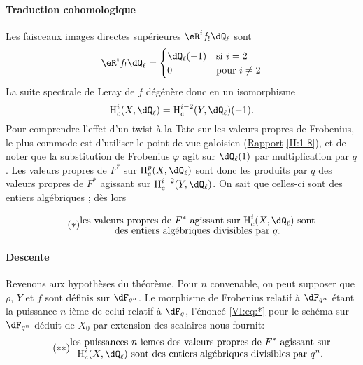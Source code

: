 \paragraph{Traduction cohomologique}
Les faisceaux images directes supérieures $\eR^i f_!\dQ_\ell$ sont 
\[
  \eR^i f_!\dQ_\ell = \begin{cases}
                       \dQ_\ell(-1) & \text{si $i = 2$} \\
                       0            & \text{pour $i\ne 2$}
                     \end{cases}
\]
La suite spectrale de Leray de $f$ dégénère donc en un isomorphisme 
\[
  \h_c^i(X,\dQ_\ell) = \h_c^{i-2}(Y,\dQ_\ell)(-1) \text{.}
\]
Pour comprendre l'effet d'un twist à la Tate sur les valeurs propres de 
Frobenius, le plus commode est d'utiliser le point de vue galoisien 
(\hyperref[II]{Rapport} \ref{II:1-8}), et de noter que la substitution de 
Frobenius $\varphi$ agit sur $\dQ_\ell(1)$ par multiplication par $q$. Les 
valeurs propres de $F^\ast$ sur $\h_c^p(X,\dQ_\ell)$ sont donc les produits par 
$q$ des valeurs propres de $F^\ast$ agissant sur $\h_c^{i-2}(Y,\dQ_\ell)$. On 
sait que celles-ci sont des entiers algébriques \cite[XXI 5.2.2]{sga7}; dès 
lors 

\begin{equation*}\tag{$*$}\label{VI:eq:*}
  \substack{\displaystyle\text{les valeurs propres de $F^\ast$ agissant sur $\h_c^i(X,\dQ_\ell)$ sont} \\
  \displaystyle\text{des entiers algébriques divisibles par $q$.}}
\end{equation*}


\paragraph{Descente}
Revenons aux hypothèses du théorème. Pour $n$ convenable, on peut 
supposer que $\rho$, $Y$ et $f$ sont définis sur $\dF_{q^n}$. Le morphisme de 
Frobenius relatif à $\dF_{q^n}$ étant la puissance $n$-ième de celui 
relatif à $\dF_q$, l'énoncé \eqref{VI:eq:*} pour le schéma sur 
$\dF_{q^n}$ déduit de $X_0$ par extension des scalaires nous fournit: 
\begin{equation*}\tag{$**$}\label{VI:eq:**}
  \substack{\displaystyle\text{les puissances $n$-\`iemes des valeurs propres de $F^\ast$ agissant sur} \\ \displaystyle\text{$\h_c^i(X,\dQ_\ell)$ sont des entiers algébriques divisibles par $q^n$.}}
\end{equation*}


